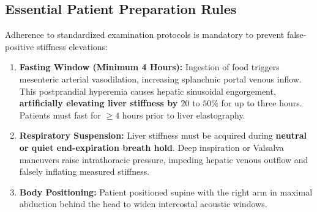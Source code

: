\documentclass[11pt,a4paper]{article}
\begin{document}
\subsection{Essential Patient Preparation Rules}
Adherence to standardized examination protocols is mandatory to prevent false-positive stiffness elevations:
\begin{enumerate}
    \item \textbf{Fasting Window (Minimum 4 Hours):} Ingestion of food triggers mesenteric arterial vasodilation, increasing splanchnic portal venous inflow. This postprandial hyperemia causes hepatic sinusoidal engorgement, \textbf{artificially elevating liver stiffness by $20\text{ to }50\%$} for up to three hours. Patients must fast for $\ge 4$ hours prior to liver elastography.
    \item \textbf{Respiratory Suspension:} Liver stiffness must be acquired during \textbf{neutral or quiet end-expiration breath hold}. Deep inspiration or Valsalva maneuvers raise intrathoracic pressure, impeding hepatic venous outflow and falsely inflating measured stiffness.
    \item \textbf{Body Positioning:} Patient positioned supine with the right arm in maximal abduction behind the head to widen intercostal acoustic windows.
\end{enumerate}
\end{document}
